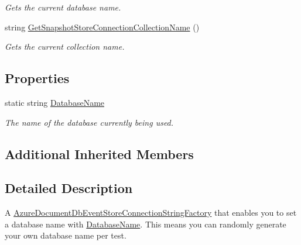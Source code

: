 \begin{DoxyCompactItemize}
\begin{DoxyCompactList}\small\item\em Gets the current database name. \end{DoxyCompactList}\item 
string \hyperlink{classCqrs_1_1Ninject_1_1Azure_1_1DocumentDb_1_1Events_1_1TestAzureDocumentDbEventStoreConnectionStringFactory_af6557ce689bd544454de70c97be4f216_af6557ce689bd544454de70c97be4f216}{Get\+Snapshot\+Store\+Connection\+Collection\+Name} ()
\begin{DoxyCompactList}\small\item\em Gets the current collection name. \end{DoxyCompactList}\end{DoxyCompactItemize}
\subsection*{Properties}
\begin{DoxyCompactItemize}
\item 
static string \hyperlink{classCqrs_1_1Ninject_1_1Azure_1_1DocumentDb_1_1Events_1_1TestAzureDocumentDbEventStoreConnectionStringFactory_ad82e2485313ff7802ad125958173f3bf_ad82e2485313ff7802ad125958173f3bf}{Database\+Name}
\begin{DoxyCompactList}\small\item\em The name of the database currently being used. \end{DoxyCompactList}\end{DoxyCompactItemize}
\subsection*{Additional Inherited Members}


\subsection{Detailed Description}
A \hyperlink{classCqrs_1_1Azure_1_1DocumentDb_1_1Events_1_1AzureDocumentDbEventStoreConnectionStringFactory_a7503e00bedc6af5686ded0b6b7719a30_a7503e00bedc6af5686ded0b6b7719a30}{Azure\+Document\+Db\+Event\+Store\+Connection\+String\+Factory} that enables you to set a database name with \hyperlink{classCqrs_1_1Ninject_1_1Azure_1_1DocumentDb_1_1Events_1_1TestAzureDocumentDbEventStoreConnectionStringFactory_ad82e2485313ff7802ad125958173f3bf_ad82e2485313ff7802ad125958173f3bf}{Database\+Name}. This means you can randomly generate your own database name per test. 



